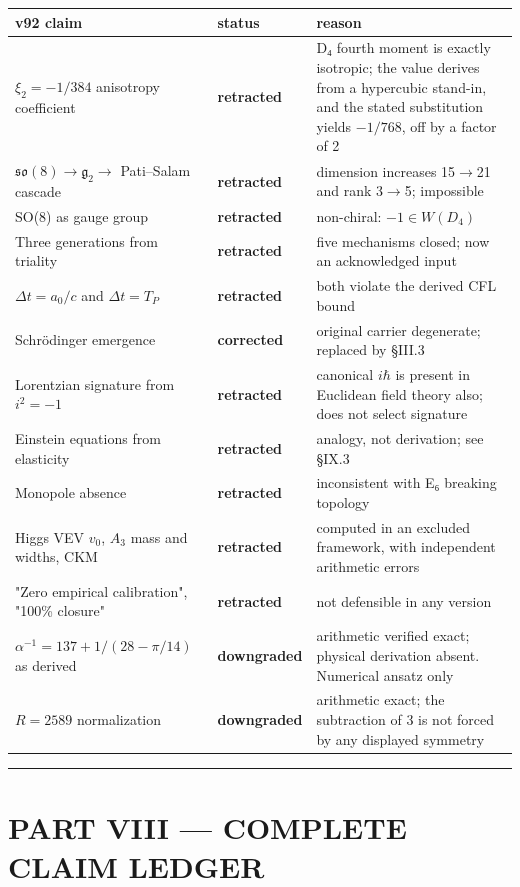 \documentclass[a4paper,11pt]{article}
\begin{document}
\begin{center}
\begin{xltabular}{\linewidth}{llX}
\hline
v92 claim & status & reason \\
\hline
$\xi_2=-1/384$ anisotropy coefficient & \textbf{retracted} & D₄ fourth moment is exactly isotropic; the value derives from a hypercubic stand-in, and the stated substitution yields $-1/768$, off by a factor of 2 \\
$\mathfrak{so}(8)\to\mathfrak{g}_2\to$ Pati–Salam cascade & \textbf{retracted} & dimension increases 15$\to$21 and rank 3$\to$5; impossible \\
SO(8) as gauge group & \textbf{retracted} & non-chiral: $-1\in W(D_4)$ \\
Three generations from triality & \textbf{retracted} & five mechanisms closed; now an acknowledged input \\
$\Delta t=a_0/c$ and $\Delta t=T_P$ & \textbf{retracted} & both violate the derived CFL bound \\
Schrödinger emergence & \textbf{corrected} & original carrier degenerate; replaced by §III.3 \\
Lorentzian signature from $i^2=-1$ & \textbf{retracted} & canonical $i\hbar$ is present in Euclidean field theory also; does not select signature \\
Einstein equations from elasticity & \textbf{retracted} & analogy, not derivation; see §IX.3 \\
Monopole absence & \textbf{retracted} & inconsistent with E₆ breaking topology \\
Higgs VEV $v_0$, $A_3$ mass and widths, CKM & \textbf{retracted} & computed in an excluded framework, with independent arithmetic errors \\
"Zero empirical calibration", "100\% closure" & \textbf{retracted} & not defensible in any version \\
$\alpha^{-1}=137+1/(28-\pi/14)$ as derived & \textbf{downgraded} & arithmetic verified exact; physical derivation absent. Numerical ansatz only \\
$R=2589$ normalization & \textbf{downgraded} & arithmetic exact; the subtraction of 3 is not forced by any displayed symmetry \\
\hline
\end{xltabular}
\end{center}

\medskip\hrule\medskip

\section*{PART VIII — COMPLETE CLAIM LEDGER}
\end{document}
